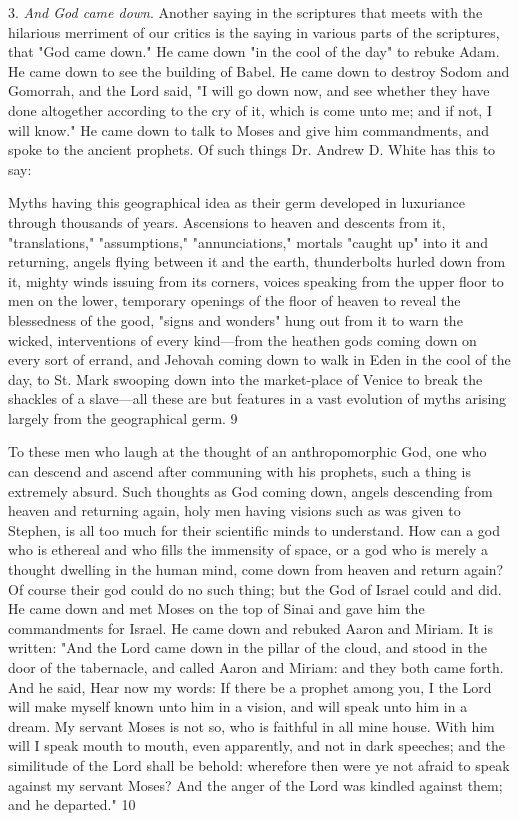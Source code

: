 3. \textit{And God came down}. Another saying in the scriptures that meets with the hilarious
merriment of our critics is the saying in various parts of the scriptures, that "God came
down." He came down "in the cool of the day" to rebuke Adam. He came down to see the
building of Babel. He came down to destroy Sodom and Gomorrah, and the Lord said, "I will
go down now, and see whether they have done altogether according to the cry of it, which is
come unto me; and if not, I will know." He came down to talk to Moses and give him
commandments, and spoke to the ancient prophets. Of such things Dr. Andrew D. White has
this to say:

Myths having this geographical idea as their germ developed in luxuriance through thousands
of years. Ascensions to heaven and descents from it, "translations," "assumptions,"
"annunciations," mortals "caught up" into it and returning, angels flying between it and the
earth, thunderbolts hurled down from it, mighty winds issuing from its corners, voices
speaking from the upper floor to men on the lower, temporary openings of the floor of
heaven to reveal the blessedness of the good, "signs and wonders" hung out from it to warn
the wicked, interventions of every kind—from the heathen gods coming down on every sort
of errand, and Jehovah coming down to walk in Eden in the cool of the day, to St. Mark
swooping down into the market-place of Venice to break the shackles of a slave—all these
are but features in a vast evolution of myths arising largely from the geographical germ. 9

To these men who laugh at the thought of an anthropomorphic God, one who can descend
and ascend after communing with his prophets, such a thing is extremely absurd. Such
thoughts as God coming down, angels descending from heaven and returning again, holy
men having visions such as was given to Stephen, is all too much for their scientific minds to
understand. How can a god who is ethereal and who fills the immensity of space, or a god
who is merely a thought dwelling in the human mind, come down from heaven and return
again? Of course their god could do no such thing; but the God of Israel could and did. He
came down and met Moses on the top of Sinai and gave him the commandments for Israel.
He came down and rebuked Aaron and Miriam. It is written: "And the Lord came down in
the pillar of the cloud, and stood in the door of the tabernacle, and called Aaron and Miriam:
and they both came forth. And he said, Hear now my words: If there be a prophet among
you, I the Lord will make myself known unto him in a vision, and will speak unto him in a
dream. My servant Moses is not so, who is faithful in all mine house. With him will I speak
mouth to mouth, even apparently, and not in dark speeches; and the similitude of the Lord
shall be behold: wherefore then were ye not afraid to speak against my servant Moses? And
the anger of the Lord was kindled against them; and he departed." 10

